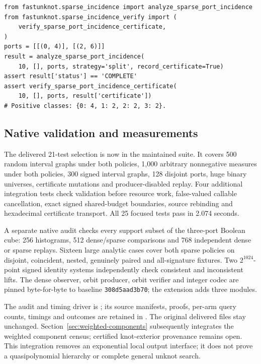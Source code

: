 \begin{verbatim}
from fastunknot.sparse_incidence import analyze_sparse_port_incidence
from fastunknot.sparse_incidence_verify import (
    verify_sparse_port_incidence_certificate,
)
ports = [[(0, 4)], [(2, 6)]]
result = analyze_sparse_port_incidence(
    10, [], ports, strategy='split', record_certificate=True)
assert result['status'] == 'COMPLETE'
assert verify_sparse_port_incidence_certificate(
    10, [], ports, result['certificate'])
# Positive classes: {0: 4, 1: 2, 2: 2, 3: 2}.
\end{verbatim}

\subsection{Native validation and measurements}

The delivered 21-test selection is now in the maintained suite. It covers
500 random interval graphs under both policies, 1,000 arbitrary nonnegative
measures under both policies, 300 signed interval graphs, 128 disjoint ports,
huge binary universes, certificate mutations and producer-disabled replay.
Four additional integration tests check validation before resource work,
false-valued callable cancellation, exact signed shared-budget boundaries,
source rebinding and hexadecimal certificate transport. All 25 focused tests
pass in 2.074 seconds.

A separate native audit checks every support subset of the three-port Boolean
cube: 256 histograms, 512 dense/sparse comparisons and 768 independent dense
or sparse replays. Sixteen large analytic cases cover both sparse policies
on disjoint, coincident, nested, genuinely paired and all-signature fixtures.
Two $2^{1024}$-point signed identity systems independently check consistent
and inconsistent lifts. The dense observer, orbit producer, orbit verifier
and integer codec are pinned byte-for-byte to baseline
\texttt{308d5aad3b70}; the extension adds three modules.



The audit and timing driver is ;
its source manifests, proofs, per-arm query counts, timings and outcomes are
retained in . The original delivered files stay
unchanged. Section~\ref{sec:weighted-components} subsequently integrates
the weighted component census; certified knot-exterior provenance remains
open. This integration removes an exponential
local output interface; it does not prove a quasipolynomial hierarchy or
complete general unknot search.
